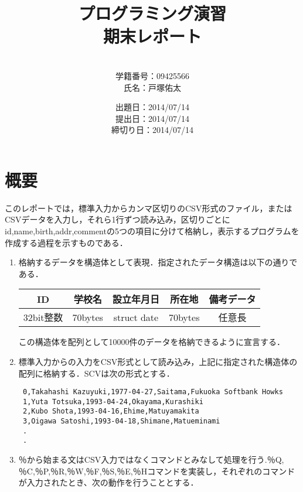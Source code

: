 \documentclass[a4j]{jarticle}
\title{プログラミング演習\\期末レポート}
\author{\\学籍番号：09425566\\氏名：戸塚佑太}
\date{出題日：2014/07/14\\提出日：2014/07/14\\締切り日：2014/07/14\\}
\begin{document}
\maketitle

\newpage



%
%

\section{概要}

このレポートでは，標準入力からカンマ区切りのCSV形式のファイル，またはCSVデータを入力し，それら1行ずつ読み込み，区切りごとにid,name,birth,addr,commentの5つの項目に分けて格納し，表示するプログラムを作成する過程を示すものである．

\begin{enumerate}
\item 格納するデータを構造体として表現．指定されたデータ構造は以下の通りである．

\begin{center}
\begin{tabular}{|c|c|c|c|c|}\hline
\centering
ID&学校名&設立年月日&所在地&備考データ\\\hline
32bit整数&70bytes&struct date&70bytes&任意長\\\hline
\end{tabular}
\end{center}

この構造体を配列として10000件のデータを格納できるように宣言する．

\item 標準入力からの入力をCSV形式として読み込み，上記に指定された構造体の配列に格納する．SCVは次の形式とする．

{\baselineskip 3mm
\begin{verbatim}
 0,Takahashi Kazuyuki,1977-04-27,Saitama,Fukuoka Softbank Howks
 1,Yuta Totsuka,1993-04-24,Okayama,Kurashiki
 2,Kubo Shota,1993-04-16,Ehime,Matuyamakita
 3,Oigawa Satoshi,1993-04-18,Shimane,Matueminami
 .
 .
\end{verbatim}
}

\item ％から始まる文はCSV入力ではなくコマンドとみなして処理を行う.％Q,％C,％P,％R,％W,％F,％S,％E,％Hコマンドを実装し，それぞれのコマンドが入力されたとき、次の動作を行うこととする．


\end{enumerate}
\end{document}
